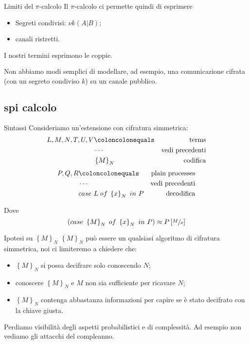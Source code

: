 \documentclass{beamer}
\theoremstyle{plain}
\theoremstyle{definition}
\theoremstyle{remark}
\newcommand{\set}[1]{\left\{#1\right\}}
\newcommand{\pa}[1]{\left(#1\right)}
\newcommand{\bra}[1]{\left[#1\right]}
\begin{document}
\begin{frame}{Limiti del $\pi$-calcolo}
  Il $\pi$-calcolo ci permette quindi di esprimere
  \begin{itemize}
  \item Segreti condivisi: $\nu k ( A|B)$;
  \item canali ristretti.
  \end{itemize}
  I nostri termini esprimono le coppie. 
  \vfill

  Non abbiamo modi semplici di modellare, ad esempio, una
  comunicazione cifrata (con un segreto condiviso $k$) su un canale
  pubblico.
\end{frame}

\subsection{spi calcolo}

\begin{frame}{Sintassi}
  Consideriamo un'estensione con cifratura simmetrica:
  \begin{align*}
    L,M,N,T,U,V & \coloncolonequals & \text{terms} \\
                & \cdots & \text{vedi precedenti} \\
                & \set{M}_N & \text{codifica}
  \end{align*}
  \begin{align*}
    P,Q,R & \coloncolonequals & \text{plain processes} \\
          & \cdots & \text{vedi precedenti} \\
          & case\ L\; of\; \set{x}_N\ in\ P & \text{decodifica}
  \end{align*}

  Dove
  \[ \pa{ case\ \set{M}_N\; of\; \set{x}_N\ in\ P} \approx
    P\bra{\sfrac{M}{x}} \]
\end{frame}

\begin{frame}{Ipotesi su $\set{M}_N$}
  $\set{M}_N$ pu\`o essere un qualsiasi algoritmo di cifratura simmetrica,
  noi ci limiteremo a chiedere che:
  \begin{itemize}
  \item $\set{M}_N$ si possa decifrare solo conoscendo $N$;
  \item conoscere $\set{M}_N$ e $M$ non sia sufficiente per ricavare $N$;
  \item $\set{M}_N$ contenga abbastanza informazioni per capire se \`e stato
    decifrato con la chiave giusta.
  \end{itemize}
  \vfill

  Perdiamo visibilit\`a degli aspetti probabilistici e di
  complessit\`a. Ad esempio non vediamo gli attacchi del compleanno.
\end{frame}
\end{document}
